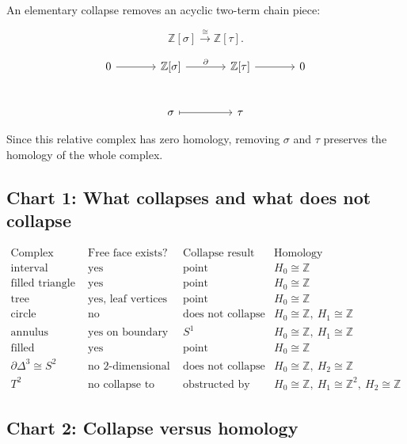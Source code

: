 \documentclass[12pt,a4paper]{article}
\theoremstyle{notespace}
\begin{document}
An elementary collapse removes an acyclic two-term chain piece:

\[
\mathbb Z[\sigma]\xrightarrow{\cong}\mathbb Z[\tau].
\]

\[
\begin{tikzcd}[column sep=large,row sep=large]
	0
	\arrow[r]
	&
	\mathbb Z[\sigma]
	\arrow[r,"\partial"]
	&
	\mathbb Z[\tau]
	\arrow[r]
	&
	0
	\\
	&
	\sigma
	\arrow[r,mapsto]
	&
	\tau
	&
\end{tikzcd}
\]

Since this relative complex has zero homology, removing \(\sigma\) and \(\tau\) preserves the homology of the whole complex.

\subsection{Chart 1: What collapses and what does not collapse}

\[
\begin{array}{c|c|c|c}
	\text{Complex} & \text{Free face exists?} & \text{Collapse result} & \text{Homology} \\
	\hline
	\text{interval}
	&
	\text{yes}
	&
	\text{point}
	&
	H_0\cong \mathbb Z
	\\
	\hline
	\text{filled triangle}
	&
	\text{yes}
	&
	\text{point}
	&
	H_0\cong \mathbb Z
	\\
	\hline
	\text{tree}
	&
	\text{yes, leaf vertices}
	&
	\text{point}
	&
	H_0\cong \mathbb Z
	\\
	\hline
	\text{circle}
	&
	\text{no}
	&
	\text{does not collapse to point}
	&
	H_0\cong \mathbb Z,\ H_1\cong \mathbb Z
	\\
	\hline
	\text{annulus}
	&
	\text{yes on boundary}
	&
	S^1
	&
	H_0\cong \mathbb Z,\ H_1\cong \mathbb Z
	\\
	\hline
	\text{filled tetrahedron}
	&
	\text{yes}
	&
	\text{point}
	&
	H_0\cong \mathbb Z
	\\
	\hline
	\partial\Delta^3\cong S^2
	&
	\text{no 2-dimensional free face}
	&
	\text{does not collapse to point}
	&
	H_0\cong \mathbb Z,\ H_2\cong \mathbb Z
	\\
	\hline
	T^2
	&
	\text{no collapse to point}
	&
	\text{obstructed by homology}
	&
	H_0\cong \mathbb Z,\ H_1\cong \mathbb Z^2,\ H_2\cong \mathbb Z
\end{array}
\]

\subsection{Chart 2: Collapse versus homology}
\end{document}
